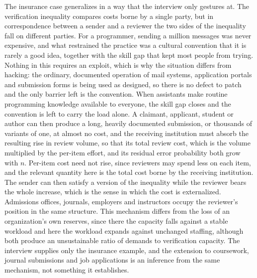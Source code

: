 \documentclass[12pt]{article}
\begin{document}
The insurance case generalizes in a way that the interview only gestures at. The verification inequality compares costs borne by a single party, but in correspondence between a sender and a reviewer the two sides of the inequality fall on different parties. For a programmer, sending a million messages was never expensive, and what restrained the practice was a cultural convention that it is rarely a good idea, together with the skill gap that kept most people from trying. Nothing in this requires an exploit, which is why the situation differs from hacking: the ordinary, documented operation of mail systems, application portals and submission forms is being used as designed, so there is no defect to patch and the only barrier left is the convention. When assistants make routine programming knowledge available to everyone, the skill gap closes and the convention is left to carry the load alone. A claimant, applicant, student or author can then produce a long, heavily documented submission, or thousands of variants of one, at almost no cost, and the receiving institution must absorb the resulting rise in review volume, so that its total review cost, which is the volume multiplied by the per-item effort, and its residual error probability both grow with $n$. Per-item cost need not rise, since reviewers may spend less on each item, and the relevant quantity here is the total cost borne by the receiving institution. The sender can then satisfy a version of the inequality while the reviewer bears the whole increase, which is the sense in which the cost is externalized. Admissions offices, journals, employers and instructors occupy the reviewer's position in the same structure. This mechanism differs from the loss of an organization's own reserves, since there the capacity falls against a stable workload and here the workload expands against unchanged staffing, although both produce an unsustainable ratio of demands to verification capacity. The interview supplies only the insurance example, and the extension to coursework, journal submissions and job applications is an inference from the same mechanism, not something it establishes.
\end{document}
